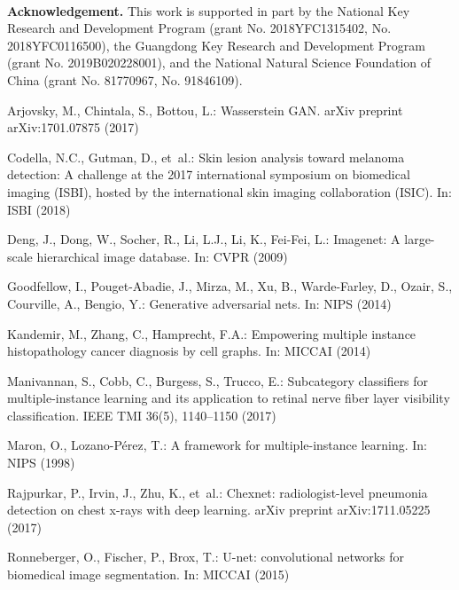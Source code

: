 \documentclass[runningheads]{llncs}
\begin{document}
~\\

\noindent\textbf{Acknowledgement.} This work is supported in part by the National Key Research and Development Program (grant No. 2018YFC1315402, No. 2018YFC0116500), the Guangdong Key Research and Development Program (grant No. 2019B020228001), and the National Natural Science Foundation of China (grant No. 81770967, No. 91846109).


 
% 
\begin{thebibliography}{10}
	\providecommand{\url}[1]{\texttt{#1}}
	\providecommand{\urlprefix}{URL }
	\providecommand{\doi}[1]{https://doi.org/#1}
	
	Arjovsky, M., Chintala, S., Bottou, L.: Wasserstein {GAN}. arXiv preprint
	arXiv:1701.07875  (2017)
	
	Codella, N.C., Gutman, D., et~al.: {Skin lesion analysis toward melanoma
		detection: A challenge at the 2017 international symposium on biomedical
		imaging (ISBI), hosted by the international skin imaging collaboration
		(ISIC)}. In: ISBI (2018)
	
	Deng, J., Dong, W., Socher, R., Li, L.J., Li, K., Fei-Fei, L.: Imagenet: A
	large-scale hierarchical image database. In: CVPR (2009)
	
	Goodfellow, I., Pouget-Abadie, J., Mirza, M., Xu, B., Warde-Farley, D., Ozair,
	S., Courville, A., Bengio, Y.: Generative adversarial nets. In: NIPS (2014)
	
	Kandemir, M., Zhang, C., Hamprecht, F.A.: Empowering multiple instance
	histopathology cancer diagnosis by cell graphs. In: MICCAI (2014)
	
	Manivannan, S., Cobb, C., Burgess, S., Trucco, E.: Subcategory classifiers for
	multiple-instance learning and its application to retinal nerve fiber layer
	visibility classification. IEEE TMI  36(5),  1140--1150 (2017)
	
	Maron, O., Lozano-P{\'e}rez, T.: A framework for multiple-instance learning.
	In: NIPS (1998)
	
	Rajpurkar, P., Irvin, J., Zhu, K., et~al.: Chexnet: radiologist-level pneumonia
	detection on chest x-rays with deep learning. arXiv preprint arXiv:1711.05225
	(2017)
	
	Ronneberger, O., Fischer, P., Brox, T.: U-net: convolutional networks for
	biomedical image segmentation. In: MICCAI (2015)
	

\end{thebibliography}
\end{document}
